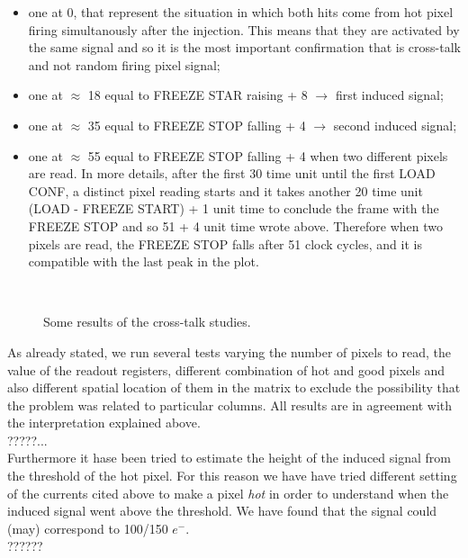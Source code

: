 \begin{itemize}
\item one at 0, that represent the situation in which both hits come from hot pixel firing simultanously after the injection. This means that they are activated by the same signal and so it is the most important confirmation that is cross-talk and not random firing pixel signal;
\item one at $\approx$ 18 equal to \textsc{FREEZE STAR} raising + 8 $\rightarrow$ first induced signal;
\item one at $\approx$ 35 equal to \textsc{FREEZE STOP} falling + 4 $\rightarrow$ second induced signal;
\item one at $\approx$ 55 equal to \textsc{FREEZE STOP} falling + 4 when two different pixels are read. In more details, after the first 30 time unit until the first \textsc{LOAD CONF}, a distinct pixel reading starts and it takes another 20 time unit (\textsc{LOAD} - \textsc{FREEZE START}) + 1 unit time to conclude the frame with the \textsc{FREEZE STOP} and so 51 + 4 unit time wrote above. Therefore when two pixels are read, the \textsc{FREEZE STOP} falls after 51 clock cycles, and it is compatible with the last peak in the plot.
\end{itemize}


\begin{figure}[h!]
\centering
{}\quad
{}\\
\caption{Some results of the cross-talk studies.}
\label{fig:xtalk}
\end{figure}

As already stated, we run several tests varying the number of pixels to read, the value of the readout registers, different combination of hot and good pixels and also different spatial location of them in the matrix to exclude the possibility that the problem was related to particular columns. All results are in agreement with the interpretation explained above.\\

?????...\\
Furthermore it hase been tried to estimate the height of the induced signal from the threshold of the hot pixel. For this reason we have have tried different setting of the currents cited above to make a pixel \textit{hot} in order to understand when the induced signal went above the threshold. We have found that the signal could (may) correspond to 100/150 $e^{-}$.\\
??????

